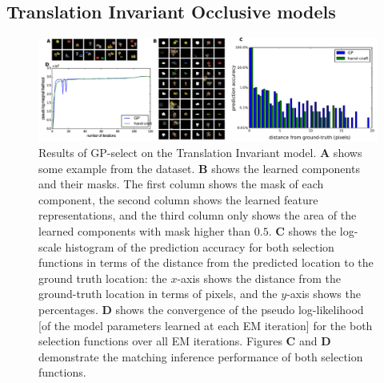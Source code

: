 \subsection{Translation Invariant Occlusive models}

\begin{figure}[t]
\begin{center}
\includegraphics[width=\textwidth]{figs/inveca/invec.pdf}

\caption{Results of GP-select on the Translation Invariant model.
\textbf{A} shows some example from the dataset.
\textbf{B} shows the learned components and their masks. The first column shows the mask of each component, the second column shows the learned feature representations, and the third column only shows the area of the learned components with mask higher than $0.5$.
\textbf{C} shows the log-scale histogram of the prediction accuracy for both selection functions in terms of the distance from the predicted location to the ground truth location: the $x$-axis shows the distance from the ground-truth location in terms of pixels, and the $y$-axis shows the percentages.
\textbf{D} shows the convergence of the pseudo log-likelihood [of the model parameters learned at each EM iteration] for the both selection functions over all EM iterations. Figures \textbf{C} and \textbf{D} demonstrate the matching inference performance of both selection functions. %
}
\label{fig:inveca}
\end{center}
\end{figure}

